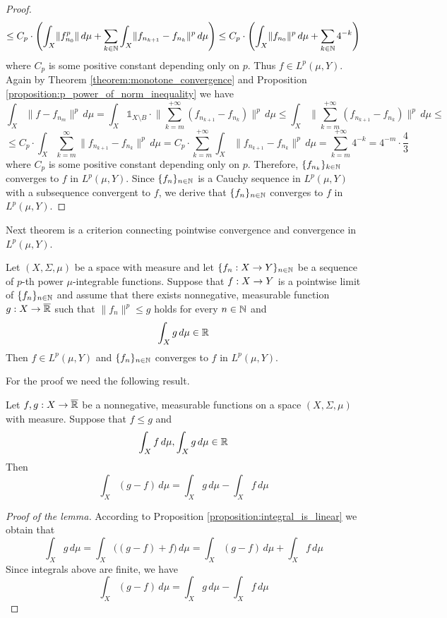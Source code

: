 \begin{proof}
    $$\leq C_p\cdot \left(\int_X\lVert f_{n_0}^p\rVert \,d\mu + \sum_{k\in {\mathbb N}}\int_X \lVert f_{n_{k+1}}-f_{n_k}\rVert^p \,d\mu\right) \leq C_p\cdot \left(\int_X\lVert f_{n_0}\rVert^p \,d\mu + \sum_{k\in {\mathbb N}}4^{-k}\right)$$
    where $C_p$ is some positive constant depending only on $p$. Thus $f\in L^p(\mu,Y)$. Again by Theorem \ref{theorem:monotone_convergence} and Proposition
    \ref{proposition:p_power_of_norm_inequality} we have
    $$\int_X\lVert f - f_{n_m}\rVert^p\,d\mu = \int_X\mathbb{1}_{X\setminus B}\cdot \big\lVert \sum_{k = m}^{+\infty}\left(f_{n_{k+1}} - f_{n_k}\right)\big\rVert^p \,d\mu \leq  \int_X \big\lVert \sum_{k=m}^{+\infty}\left(f_{n_{k+1}} - f_{n_k}\right)\big\rVert^p \,d\mu \leq $$
    $$\leq C_p\cdot \int_X\sum_{k=m}^{\infty}\lVert f_{n_{k+1}} - f_{n_k}\rVert^p \,d\mu =C_p\cdot \sum_{k=m}^{+\infty}\int_X\lVert f_{n_{k+1}} - f_{n_k}\rVert^p \,d\mu = \sum_{k=m}^{+\infty}4^{-k} = 4^{-m}\cdot \frac{4}{3} $$
    where $C_p$ is some positive constant depending only on $p$. Therefore, $\{f_{n_k}\}_{k\in {\mathbb N}}$ converges to $f$ in $L^p(\mu,Y)$. Since $\{f_n\}_{n\in {\mathbb N}}$ is a Cauchy sequence in $L^p(\mu,Y)$ with a subsequence convergent to $f$, we derive that $\{f_n\}_{n\in {\mathbb N}}$ converges to $f$ in $L^p(\mu,Y)$.
\end{proof}
\noindent
Next theorem is a criterion connecting pointwise convergence and convergence in $L^p(\mu,Y)$.

\begin{theorem}\label{theorem:dominated_convergence}
    Let $(X,\Sigma,\mu)$ be a space with measure and let $\{f_n:X\rightarrow Y\}_{n\in {\mathbb N}}$ be a sequence of $p$-th power $\mu$-integrable functions. Suppose that $f:X\rightarrow Y$ is a pointwise limit of $\{f_n\}_{n\in {\mathbb N}}$ and assume that there exists nonnegative, measurable function $g:X\rightarrow \overline{{\mathbb R}}$ such that $\lVert f_n\rVert^p \leq g$ holds for every $n\in {\mathbb N}$ and
    $$\int_X g\,d\mu\in {\mathbb R}$$
    Then $f\in L^p(\mu,Y)$ and $\{f_n\}_{n\in {\mathbb N}}$ converges to $f$ in $L^p(\mu,Y)$.
\end{theorem}
For the proof we need the following result.

\begin{lemma}\label{lemma:difference_of_integrals}
    Let $f, g:X\rightarrow \overline{{\mathbb R}}$ be a nonnegative, measurable functions on a space $(X,\Sigma,\mu)$ with measure. Suppose that $f \leq g$ and
    $$\int_Xf\,d\mu, \int_Xg\,d\mu\in {\mathbb R}$$
    Then
    $$\int_X(g-f)\,d\mu = \int_Xg\,d\mu - \int_Xf\,d\mu$$
\end{lemma}
\begin{proof}[Proof of the lemma]
    According to Proposition \ref{proposition:integral_is_linear} we obtain that
    $$\int_Xg\,d\mu = \int_X\big((g-f) + f\big)\,d\mu = \int_X(g-f)\,d\mu + \int_Xf\,d\mu$$
    Since integrals above are finite, we have
    $$\int_X(g-f)\,d\mu = \int_Xg\,d\mu - \int_Xf\,d\mu$$
\end{proof}

